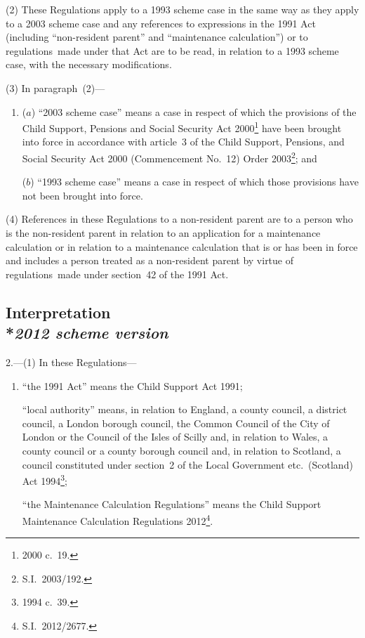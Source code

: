\documentclass[12pt,a4paper]{article}
\begin{document}
(2) These Regulations apply to a 1993 scheme case in the same way as they apply to a 2003 scheme case and any references to expressions in the 1991 Act (including “non-resident parent” and “maintenance calculation”) or to regulations~made under that Act are to be read, in relation to a 1993 scheme case, with the necessary modifications.

(3) In paragraph~(2)—
\begin{enumerate}\item[]
($a$) “2003 scheme case” means a case in respect of which the provisions of the Child Support, Pensions and Social Security Act 2000\footnote{2000 c.~19.} have been brought into force in accordance with article~3 of the Child Support, Pensions, and Social Security Act 2000 (Commencement No.~12) Order 2003\footnote{S.I.~2003/192.}; and

($b$) “1993 scheme case” means a case in respect of which those provisions have not been brought into force.
\end{enumerate}

(4) References in these Regulations to a non-resident parent are to a person who is the non-resident parent in relation to an application for a maintenance calculation or in relation to a maintenance calculation that is or has been in force and includes a person treated as a non-resident parent by virtue of regulations~made under section~42 of the 1991 Act.

\subsection[2. Interpretation --- \emph{2012 scheme version}]{Interpretation\\*\emph{2012 scheme version}}

2.---(1)  In these Regulations—
\begin{enumerate}\item[]
“the 1991 Act” means the Child Support Act 1991;

“local authority” means, in relation to England, a county council, a district council, a London borough council, the Common Council of the City of London or the Council of the Isles of Scilly and, in relation to Wales, a county council or a county borough council and, in relation to Scotland, a council constituted under section~2 of the Local Government etc.\ (Scotland) Act 1994\footnote{1994 c.~39.};

%
“the Maintenance Calculation Regulations” means the Child Support Maintenance Calculation Regulations 2012\footnote{S.I.~2012/2677.}.
\end{enumerate}
\end{document}
